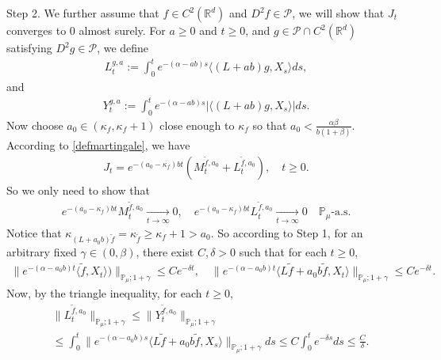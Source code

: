 \documentclass[12pt,a4paper]{amsart}
\theoremstyle{plain}
\theoremstyle{definition}
\numberwithin{equation}{section}
\begin{document}
	Step 2.
	We further assume that $f\in C^2(\mathbb R^d)$ and $D^2f \in \mathcal{P}$, we will show that $J_t$ converges to $0$ almost surely.
	For $a \geq 0$ and $ t\geq 0$, and $g\in \mathcal{P}\cap C^2(\mathbb{R}^d)$ satisfying $D^2g\in \mathcal{P}$, we define
\begin{equation}\begin{split}
	L_t^{g,a}:=\int_0^t e^{-(\alpha-ab)s}\langle (L+ab)g,X_s\rangle ds,
\end{split}\end{equation}
and
\begin{equation}\begin{split}
    Y_t^{g,a}
    :=\int_0^t e^{-(\alpha-ab)s}|\langle (L+ab)g,X_s\rangle|ds.
\end{split}\end{equation}
	Now choose $a_0 \in (\kappa_{f}, \kappa_f + 1)$ close enough to $\kappa_f$ so that $a_0 < \frac{\alpha \beta}{b(1+\beta)}$.
	According to \eqref{defmartingale}, we have
\begin{align*}
    J_t
    =e^{-(a_0-\kappa_f)bt} (M_t^{\tilde{f}, a_0}+L_t^{\tilde{f}, a_0}),
    \quad t\geq 0.
\end{align*}
	So we only need to show that
\begin{align*}
    e^{-(a_0-\kappa_f)b t}M_t^{\tilde{f},a_0}
    \xrightarrow[t\to \infty]{} 0,
    \quad e^{-(a_0-\kappa_f)b t}L_t^{\tilde{f},a_0}
    \xrightarrow[t\to \infty]{} 0
    \quad \mathbb{P}_{\mu}\text{-a.s.}
\end{align*}
	Notice that $\kappa_{(L+a_0 b)\tilde{f}}=\kappa_{\tilde{f}}\geq \kappa_f+1 > a_0$.
	So according to Step 1, for an arbitrary fixed $\gamma\in (0,\beta)$, there exist $C, \delta>0$ such that for each $t\geq 0$,
\begin{equation}\begin{split}
    \|e^{-(\alpha-a_0 b)t}\langle \tilde{f},X_t\rangle)\|_{\mathbb{P}_{\mu};1+\gamma}
    \leq C e^{-\delta t},
    \quad \|e^{-(\alpha-a_0 b)t}\langle L\tilde{f}+a_0 b\tilde{f},X_t\rangle\|_{\mathbb{P}_{\mu};1+\gamma}
    \leq C e^{-\delta t}.
\end{split}\end{equation}
	Now, by the triangle inequality, for each $t\geq 0$,
\begin{align*}
    &\|L_t^{\tilde{f},a_0}\|_{\mathbb{P}_{\mu};1+\gamma}
    \leq\|Y_t^{\tilde{f},a_0}\|_{\mathbb{P}_{\mu};1+\gamma}
    \\&\leq \int_0^t \|e^{-(\alpha-a_0 b)s}\langle L\tilde{f}+a_0 b\tilde{f},X_s\rangle\|_{\mathbb{P}_{\mu};1+\gamma}ds\leq C \int_0^t e^{-\delta s}ds\leq\frac{C}{\delta}.
\end{align*}
\end{document}
